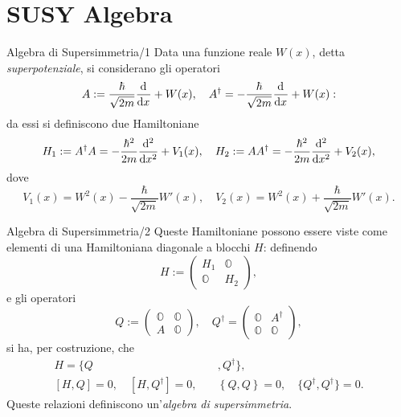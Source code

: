 \documentclass[11pt,aspectratio=169,handout]{beamer}
\begin{document}
\section{SUSY Algebra}
\begin{frame}{Algebra di Supersimmetria/1}
    Data una funzione reale $W(x)$, detta \textit{superpotenziale}, si considerano
    gli operatori
    $${A} :=  \frac{\hbar}{\sqrt{2m}}\dv[]{}{x}+W(x),\quad{A}^\dagger =
    -\frac{\hbar}{\sqrt{2m}}\dv[]{}{x}+W(x):$$
    da essi si definiscono due Hamiltoniane
    $$H_1 := A^\dagger A = -\frac{\hbar^2}{2m}\dv[2]{}{x} + V_1(x),\quad
    H_2:=AA^\dagger = -\frac{\hbar^2}{2m}\dv[2]{}{x}+V_2(x),$$
    dove
    $$V_1(x) = W^2(x) - \frac{\hbar}{\sqrt{2m}}W'(x),\quad V_2(x) = W^2(x) +
    \frac{\hbar}{\sqrt{2m}}W'(x).$$
\end{frame}
\begin{frame}{Algebra di Supersimmetria/2}
    Queste Hamiltoniane possono essere viste come elementi di una Hamiltoniana
    diagonale a
    blocchi $H$: definendo
    $$H :=\begin{pmatrix}
        H_1&\mathbb{O}\\
        \mathbb{O}&H_2
    \end{pmatrix},
    $$
    e gli operatori
    $$Q := \begin{pmatrix}
        \mathbb{O}&\mathbb{O}\\
        A&\mathbb{O}
        \end{pmatrix},\quad Q^\dagger=\begin{pmatrix}
        \mathbb{O}&A^\dagger\\
        \mathbb{O}&\mathbb{O}
    \end{pmatrix},
    $$
    si ha, per costruzione, che
    \begin{align*}
        H = \{Q&,Q^\dagger\},\\
        \left[H,Q\right]=0,\quad \left[H,Q^\dagger\right]=0,\quad&
        \left\{Q,Q\right\}=0,\quad\{Q^\dagger,Q^\dagger\}=0.
    \end{align*}
    Queste relazioni definiscono un'\textit{algebra di supersimmetria}.
\end{frame}
\end{document}
